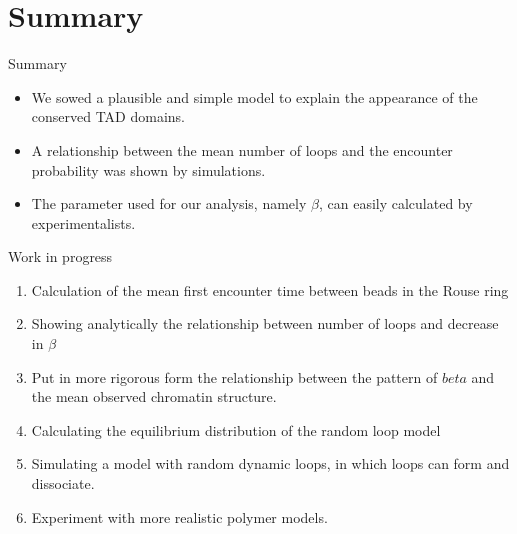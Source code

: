 \documentclass[8pt]{beamer}
\begin{document}
\section{Summary}\label{section_summaryAndFutureWork}
\begin{frame}{Summary}
\begin{itemize}
\item We sowed a plausible and simple model to explain the appearance of the conserved TAD domains. 
\item A relationship between the mean number of loops and the encounter probability was shown by simulations.
\item The parameter used for our analysis, namely $\beta$, can easily calculated by experimentalists. 
\end{itemize}
\end{frame}

\begin{frame}{Work in progress}
\begin{enumerate}
\item Calculation of the mean first encounter time between beads in the Rouse ring
\item Showing analytically the relationship between number of loops and decrease in $\beta$
\item Put in more rigorous form the relationship between the pattern of $beta$ and the mean observed chromatin structure.
\item Calculating the equilibrium distribution of the random loop model
\item Simulating a model with random dynamic loops, in which loops can form and dissociate.
\item Experiment with more realistic polymer models.
\end{enumerate}
\end{frame}
\end{document}
